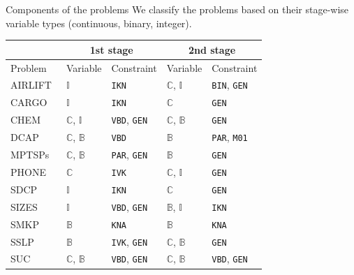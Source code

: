 \documentclass{beamer}
\def\seven{\fontsize{7pt}{7pt}\selectfont}
\newcommand{\airlift}{\textsf{AIRLIFT}}
\newcommand{\chem}{\textsf{CHEM}}
\newcommand{\dcap}{\textsf{DCAP}}
\newcommand{\sdcp}{\textsf{SDCP}}
\newcommand{\mptsps}{\textsf{MPTSPs}}
\newcommand{\sizes}{\textsf{SIZES}}
\newcommand{\smkp}{\textsf{SMKP}}
\newcommand{\sslp}{\textsf{SSLP}}
\newcommand{\suc}{\textsf{SUC}}
\newcommand{\cargo}{\textsf{CARGO}}
\newcommand{\phone}{\textsf{PHONE}}
\begin{document}
	\begin{frame}{Components of the problems}
		We classify the problems based on their stage-wise variable types (continuous, binary, integer).		
		\begin{table}[H]
			\seven
			\centering
			\label{table:prob_class}
			\begin{threeparttable}
				\begin{tabular}{@{}lllll@{}}
					\toprule
					& \multicolumn{2}{c}{1st stage}                              				  	& \multicolumn{2}{c}{2nd stage}                             			        \\ \midrule
					Problem 	     & Variable                    & Constraint                   	& Variable                    & Constraint                  				    \\ \midrule
					\airlift\  & $\mathbb{I}$ & \texttt{IKN}& $\mathbb{C}$, $\mathbb{I}$ & \texttt{BIN}, \texttt{GEN}\\
					\cargo\  & $\mathbb{I}$ & \texttt{IKN} & $\mathbb{C}$ & \texttt{GEN}\\		
					\chem\  & $\mathbb{C}$, $\mathbb{I}$ & \texttt{VBD}, \texttt{GEN} & $\mathbb{C}$, $\mathbb{B}$ & \texttt{GEN}\\				
					\dcap\     & $\mathbb{C}$, $\mathbb{B}$  & \texttt{VBD}                	& $\mathbb{B}$                & \texttt{PAR}, \texttt{M01} 			    		\\
					\mptsps\   & $\mathbb{C}$, $\mathbb{B}$  & \texttt{PAR}, \texttt{GEN}		& $\mathbb{B}$                & \texttt{GEN}               						\\
					\phone\  & $\mathbb{C}$ & \texttt{IVK} & $\mathbb{C}$, $\mathbb{I}$ & \texttt{GEN} \\			
					\sdcp\ & $\mathbb{I}$ & \texttt{IKN}& $\mathbb{C}$ & \texttt{GEN}\\
					\sizes\  & $\mathbb{I}$ 			   & \texttt{VBD}, \texttt{GEN} 	& $\mathbb{B}$, $\mathbb{I}$  & \texttt{IKN}             						\\
					\smkp\   & $\mathbb{B}$                & \texttt{KNA}                	& $\mathbb{B}$                & \texttt{KNA}              						\\
					\sslp\   & $\mathbb{B}$                & \texttt{IVK}, \texttt{GEN} 	& $\mathbb{C}$, $\mathbb{B}$  & \texttt{GEN}             						\\
					\suc\   & $\mathbb{C}$, $\mathbb{B}$                 & \texttt{VBD}, \texttt{GEN}       	& $\mathbb{C}$, $\mathbb{B}$  &  \texttt{VBD}, \texttt{GEN}                                  					\\ \bottomrule

\end{tabular}
\end{threeparttable}
\end{table}
\end{frame}
\end{document}
